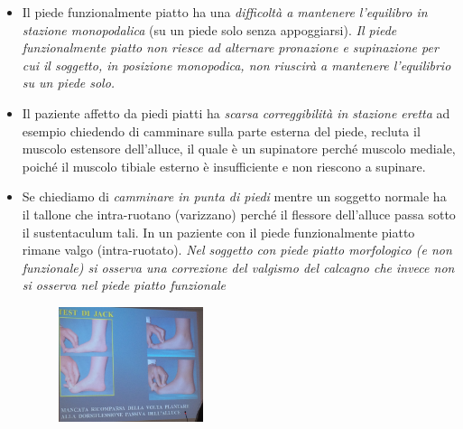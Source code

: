 \begin{itemize}
\item
  Il piede funzionalmente piatto ha una \emph{difficoltà a mantenere l'equilibro in stazione monopodalica} (su un piede solo senza appoggiarsi). \emph{Il piede funzionalmente piatto non riesce ad alternare pronazione e supinazione per cui il soggetto, in posizione monopodica, non riuscirà a mantenere l'equilibrio su un piede solo.}
\item
  Il paziente affetto da piedi piatti ha \emph{scarsa correggibilità in stazione eretta} ad esempio chiedendo di camminare sulla parte esterna del piede, recluta il muscolo estensore dell'alluce, il quale è un supinatore perché muscolo mediale, poiché il muscolo tibiale esterno è insufficiente e non riescono a supinare.
\item
  Se chiediamo di \emph{camminare in punta di piedi} mentre un soggetto normale ha il tallone che intra-ruotano (varizzano) perché il flessore dell'alluce passa sotto il sustentaculum tali. In un paziente con il piede funzionalmente piatto rimane valgo (intra-ruotato). \emph{Nel soggetto con piede piatto morfologico (e non funzionale) si osserva una correzione del valgismo del calcagno che invece non si osserva nel piede piatto funzionale}

\begin{figure}[!ht]
\centering
\includegraphics[width=0.4\textwidth]{014/image8.jpeg}
\end{figure}
  

\end{itemize}
